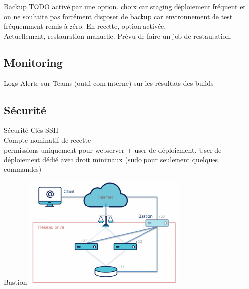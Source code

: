 \begin{frame}{Backup}
	TODO activé par une option. choix car staging déploiement fréquent et on ne souhaite pas forcément disposer de backup car environnement de test fréquemment remis à zéro. En recette, option activée. \\ 
	
	Actuellement, restauration manuelle. Prévu de faire un job de restauration.
\end{frame}

\subsection{Monitoring}
\begin{frame}{\subsecname}
	Logs
	Alerte sur Teams (outil com interne) sur les résultats des builds
\end{frame}

\subsection{Sécurité}
\begin{frame}{Sécurité}
	Clés SSH  \\
	Compte nominatif de recette \\
	permissions uniquement pour webserver + user de déploiement. 
	User de déploiement dédié avec droit minimaux (sudo pour seulement quelques commandes)
\end{frame}

\begin{frame}{Bastion}
	\centering \includegraphics[width=0.60\textwidth]{../img/bastion.png}
\end{frame}
